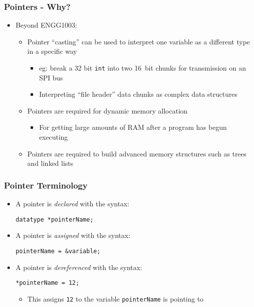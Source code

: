 \documentclass[14pt]{beamer}
\begin{document}
\begin{frame}
\frametitle{Pointers - Why?}
\begin{itemize}
\item Beyond ENGG1003:
	\begin{itemize}
		\item Pointer ``casting'' can be used to interpret one variable as a different type in a specific way
			\begin{itemize}
				\item eg: break a 32 bit \texttt{int} into two 16~bit chunks for transmission on an SPI bus
				\item Interpreting ``file header'' data chunks as complex data structures
			\end{itemize}
		\item Pointers are required for dynamic memory allocation
			\begin{itemize}
				\item For getting large amounts of RAM after a program has begun executing
			\end{itemize}
		\item Pointers are required to build advanced memory structures such as trees and linked lists
	\end{itemize}
\end{itemize}
\end{frame}

\begin{frame}[fragile]
\frametitle{Pointer Terminology}
\begin{itemize}
\item A pointer is \textit{declared} with the syntax:
\begin{lstlisting}[style=CStyle]
datatype *pointerName;
\end{lstlisting}
\item A pointer is \textit{assigned} with the syntax:
\begin{lstlisting}[style=CStyle]
pointerName = &variable;
\end{lstlisting}
\item A pointer is \textit{dereferenced} with the syntax:
\begin{lstlisting}[style=CStyle]
*pointerName = 12;
\end{lstlisting}
	\begin{itemize}
		\item This assigns \texttt{12} to the variable \texttt{pointerName} is pointing to
	\end{itemize}
\end{itemize}
\end{frame}
\end{document}
